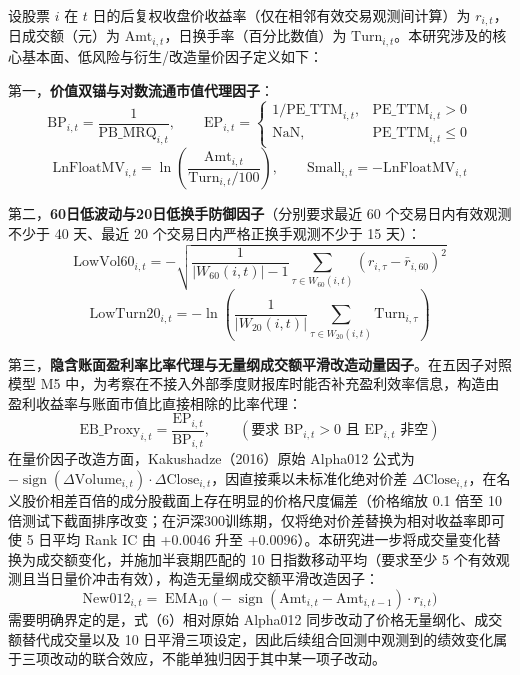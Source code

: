 \documentclass[12pt,a4paper]{article}
\begin{document}
设股票 $i$ 在 $t$ 日的后复权收盘价收益率（仅在相邻有效交易观测间计算）为 $r_{i,t}$，日成交额（元）为 $\text{Amt}_{i,t}$，日换手率（百分比数值）为 $\text{Turn}_{i,t}$。本研究涉及的核心基本面、低风险与衍生/改造量价因子定义如下：

第一，\textbf{价值双锚与对数流通市值代理因子}：
\begin{equation}
\text{BP}_{i,t} = \frac{1}{\text{PB\_MRQ}_{i,t}}, \qquad
\text{EP}_{i,t} = \begin{cases} 1 / \text{PE\_TTM}_{i,t}, & \text{PE\_TTM}_{i,t} > 0 \\ \text{NaN}, & \text{PE\_TTM}_{i,t} \le 0 \end{cases}
\end{equation}
\begin{equation}
\text{LnFloatMV}_{i,t} = \ln\!\left(\frac{\text{Amt}_{i,t}}{\text{Turn}_{i,t} / 100}\right), \qquad \text{Small}_{i,t} = -\text{LnFloatMV}_{i,t}
\end{equation}

第二，\textbf{60日低波动与20日低换手防御因子}（分别要求最近 60 个交易日内有效观测不少于 40 天、最近 20 个交易日内严格正换手观测不少于 15 天）：
\begin{equation}
\text{LowVol60}_{i,t} = -\sqrt{\frac{1}{|W_{60}(i,t)| - 1} \sum_{\tau \in W_{60}(i,t)} \left(r_{i,\tau} - \bar{r}_{i,60}\right)^2}
\end{equation}
\begin{equation}
\text{LowTurn20}_{i,t} = -\ln\!\left(\frac{1}{|W_{20}(i,t)|} \sum_{\tau \in W_{20}(i,t)} \text{Turn}_{i,\tau}\right)
\end{equation}

第三，\textbf{隐含账面盈利率比率代理与无量纲成交额平滑改造动量因子}。在五因子对照模型 M5 中，为考察在不接入外部季度财报库时能否补充盈利效率信息，构造由盈利收益率与账面市值比直接相除的比率代理：
\begin{equation}
\text{EB\_Proxy}_{i,t} = \frac{\text{EP}_{i,t}}{\text{BP}_{i,t}}, \qquad (\text{要求 } \text{BP}_{i,t} > 0 \text{ 且 } \text{EP}_{i,t} \text{ 非空})
\end{equation}
在量价因子改造方面，Kakushadze（2016）原始 Alpha012 公式为 $-\operatorname{sign}(\Delta \text{Volume}_{i,t}) \cdot \Delta \text{Close}_{i,t}$，因直接乘以未标准化绝对价差 $\Delta \text{Close}_{i,t}$，在名义股价相差百倍的成分股截面上存在明显的价格尺度偏差（价格缩放 0.1 倍至 10 倍测试下截面排序改变；在沪深300训练期，仅将绝对价差替换为相对收益率即可使 5 日平均 Rank IC 由 +0.0046 升至 +0.0096）。本研究进一步将成交量变化替换为成交额变化，并施加半衰期匹配的 10 日指数移动平均（要求至少 5 个有效观测且当日量价冲击有效），构造无量纲成交额平滑改造因子：
\begin{equation}
\text{New012}_{i,t} = \operatorname{EMA}_{10}\!\Big(-\operatorname{sign}\!\left(\text{Amt}_{i,t} - \text{Amt}_{i,t-1}\right) \cdot r_{i,t}\Big)
\end{equation}
需要明确界定的是，式（6）相对原始 Alpha012 同步改动了价格无量纲化、成交额替代成交量以及 10 日平滑三项设定，因此后续组合回测中观测到的绩效变化属于三项改动的联合效应，不能单独归因于其中某一项子改动。
\end{document}

